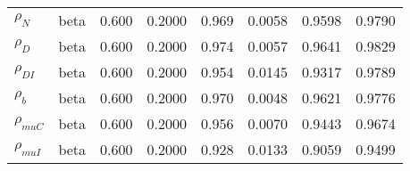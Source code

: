 \begin{center}
\begin{longtable}{llcccccc}
${\rho_N}$ & beta &   0.600 & 0.2000 &   0.969& 0.0058 &  0.9598 &  0.9790 \\ 
${\rho_D}$ & beta &   0.600 & 0.2000 &   0.974& 0.0057 &  0.9641 &  0.9829 \\ 
${\rho_{DI}}$ & beta &   0.600 & 0.2000 &   0.954& 0.0145 &  0.9317 &  0.9789 \\ 
${\rho_b}$ & beta &   0.600 & 0.2000 &   0.970& 0.0048 &  0.9621 &  0.9776 \\ 
${\rho_{muC}}$ & beta &   0.600 & 0.2000 &   0.956& 0.0070 &  0.9443 &  0.9674 \\ 
${\rho_{muI}}$ & beta &   0.600 & 0.2000 &   0.928& 0.0133 &  0.9059 &  0.9499 \\ 
\end{longtable}
 \end{center}
